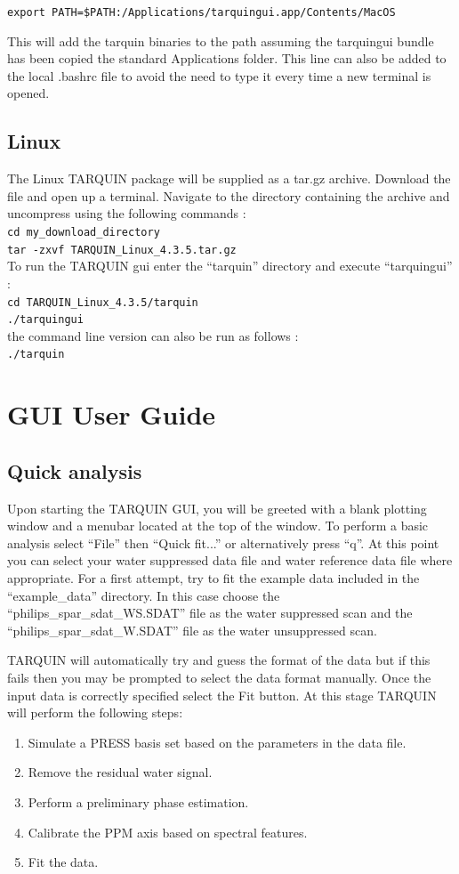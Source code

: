 \documentclass[a4paper,12pt]{article}
\newcommand{\ver}{4.3.5}
\begin{document}
{\tt export PATH=\$PATH:/Applications/tarquingui.app/Contents/MacOS}

This will add the tarquin binaries to the path assuming the tarquingui bundle has been copied the standard Applications folder. This line can also be added to the local .bashrc file to avoid the need to type it every time a new terminal is opened.

\subsection{Linux}
The Linux TARQUIN package will be supplied as a tar.gz archive.  Download the file and open up a terminal.  Navigate to the directory containing the archive and uncompress using the following commands : \\
{\tt cd my\_download\_directory \\
tar -zxvf TARQUIN\_Linux\_\ver.tar.gz} \\
To run the TARQUIN gui enter the ``tarquin'' directory and execute ``tarquingui'' : \\
{\tt cd TARQUIN\_Linux\_\ver/tarquin \\
./tarquingui } \\
the command line version can also be run as follows : \\
{\tt ./tarquin}

\section{GUI User Guide}
\subsection{Quick analysis}
Upon starting the TARQUIN GUI, you will be greeted with a blank plotting window and a menubar located at the top of the window. To perform a basic analysis select ``File'' then ``Quick fit...'' or alternatively press ``q''.  At this point you can select your water suppressed data file and water reference data file where appropriate.  For a first attempt, try to fit the example data included in the ``example\_data'' directory. In this case choose the ``philips\_spar\_sdat\_WS.SDAT'' file as the water suppressed scan and the ``philips\_spar\_sdat\_W.SDAT'' file as the water unsuppressed scan.

TARQUIN will automatically try and guess the format of the data but if this fails then you may be prompted to select the data format manually.  Once the input data is correctly specified select the Fit button.  At this stage TARQUIN will perform the following steps:
\begin{enumerate}
\item Simulate a PRESS basis set based on the parameters in the data file. 
\item Remove the residual water signal.
\item Perform a preliminary phase estimation.
\item Calibrate the PPM axis based on spectral features.
\item Fit the data.
\end{enumerate}
\end{document}
